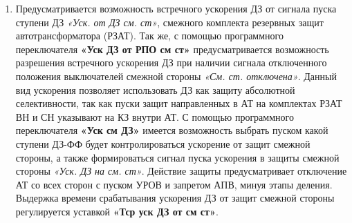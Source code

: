\begin{enumerate}[label=\arabic{section}.\arabic{subsection}.\arabic*,  align=left, labelsep=4pt, leftmargin=0pt, itemindent=57pt]
\item
Предусматривается возможность встречного ускорения ДЗ от сигнала пуска ступени ДЗ \textit{«Уск. от ДЗ см.
ст»}, смежного комплекта резервных защит автотрансформатора (РЗАТ). Так же, с помощью программного
переключателя \textbf{«Уск ДЗ от РПО см ст»} предусматривается возможность разрешения встречного ускорения
ДЗ при наличии сигнала отключенного положения выключателей смежной стороны \textit{«См. ст. отключена»}.
Данный вид ускорения позволяет использовать ДЗ как защиту абсолютной селективности, так как пуски защит
направленных в АТ на комплектах РЗАТ ВН и СН указывают на КЗ внутри АТ. С помощью программного
переключателя \textbf{«Уск см ДЗ»} имеется возможность выбрать пуском какой ступени ДЗ-ФФ будет
контролироваться ускорение от защит смежной стороны, а также формироваться сигнал пуска ускорения в
защиты смежной стороны \textit{«Уск. ДЗ на см. ст»}. Действие защиты предусматривает отключение АТ со всех
сторон с пуском УРОВ и запретом АПВ, минуя этапы деления. Выдержка времени срабатывания ускорения ДЗ
от защит смежной стороны регулируется уставкой \textbf{«Тср уск ДЗ от см ст»}.



\end{enumerate}
